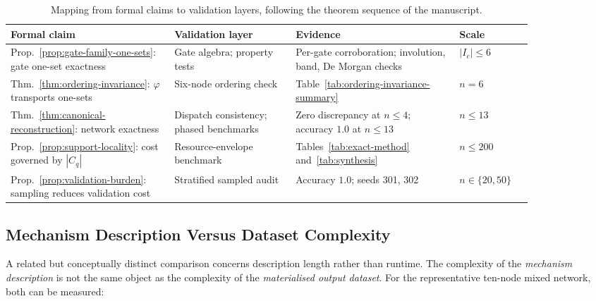 \documentclass[11pt]{article}
\theoremstyle{definition}
\newcommand{\Ic}{I_c}
\begin{document}
\begin{table}[h]
\centering
\small
\begin{tabular}{p{0.27\linewidth}p{0.20\linewidth}p{0.27\linewidth}p{0.12\linewidth}}
\toprule
\textbf{Formal claim} & \textbf{Validation layer} & \textbf{Evidence} & \textbf{Scale} \\
\midrule
Prop.~\ref{prop:gate-family-one-sets}: gate one-set exactness &
Gate algebra; property tests &
Per-gate corroboration; involution, band, De Morgan checks &
\(|\Ic|\leq 6\) \\[3pt]
Thm.~\ref{thm:ordering-invariance}: \(\varphi\) transports one-sets &
Six-node ordering check &
Table~\ref{tab:ordering-invariance-summary} &
\(n=6\) \\[3pt]
Thm.~\ref{thm:canonical-reconstruction}: network exactness &
Dispatch consistency; phased benchmarks &
Zero discrepancy at \(n\leq 4\); accuracy \(1.0\) at \(n\leq 13\) &
\(n\leq 13\) \\[3pt]
Prop.~\ref{prop:support-locality}: cost governed by \(|C_q|\) &
Resource-envelope benchmark &
Tables~\ref{tab:exact-method} and~\ref{tab:synthesis} &
\(n\leq 200\) \\[3pt]
Prop.~\ref{prop:validation-burden}: sampling reduces validation cost &
Stratified sampled audit &
Accuracy \(1.0\); seeds 301, 302 &
\(n\in\{20,50\}\) \\
\bottomrule
\end{tabular}
\caption{Mapping from formal claims to validation layers, following the theorem sequence of the manuscript.}
\label{tab:validation-map}
\end{table}

\subsection{Mechanism Description Versus Dataset Complexity}

A related but conceptually distinct comparison concerns description length rather than runtime. The
complexity of the \emph{mechanism description} is not the same object as the complexity of the
\emph{materialised output dataset}. For the representative ten-node mixed network, both can be
measured:
\end{document}
